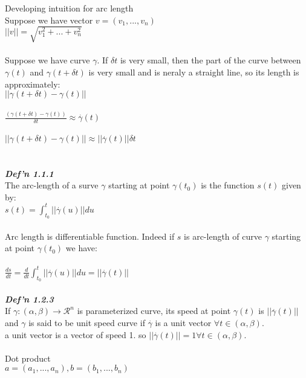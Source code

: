 \documentclass[12pt]{article}
\begin{document}
Developing intuition for arc length \\
Suppose we have vector \( v = (v_1, ... , v_n) \) \\
\( ||v|| = \sqrt{v_1^2 + ... + v_n^2} \) \\
\\
Suppose we have curve \( \gamma \). If \( \delta t \) is very small, then the part of the curve between \( \gamma(t) \) and \( \gamma(t + \delta t) \) is very small and is neraly a straight line, so its length is approximately: \\
\( || \gamma(t + \delta t) - \gamma (t) || \) \\
\\
\( \frac{ (\gamma (t + \delta t) - \gamma(t) ) }{\delta t} \approx \overset{.}{\gamma}(t) \) \\
\\
\( || \gamma (t + \delta t) - \gamma(t) || \approx || \overset{.}{\gamma}(t) || \delta t \) \\
\\
\\
\emph{\bfseries Def'n 1.1.1} \\
The arc-length of a surve \( \gamma \) starting at point \( \gamma(t_0) \) is the function \( s(t) \) given by: \\
\( s(t) = \int_{t_0}^{t} || \overset{.}{\gamma}(u) || du \) \\
\\
Arc length is differentiable function. Indeed if \( s \) is arc-length of curve \( \gamma \) starting at point \( \gamma(t_0) \) we have: \\
\\
\( \frac{ds}{dt} = \frac{d}{dt} \int_{t_0}^{t} || \overset{.}{\gamma}(u) || du = || \overset{.}{\gamma}(t) || \)
\\
\\
\emph{\bfseries Def'n 1.2.3} \\
If \( \gamma:(\alpha, \beta) \longrightarrow \mathcal{R}^n \) is parameterized curve, its speed at point \( \gamma(t) \) is \( || \overset{.}{\gamma}(t) || \) and \( \gamma \) is said to be unit speed curve if \( \overset{.}{\gamma} \) is a unit vector \( \forall t \in (\alpha, \beta) \). 
\\
a unit vector is a vector of speed 1. so \( || \overset{.}{\gamma}(t) || = 1 \forall t \in (\alpha, \beta) \).
\\
\\
Dot product \\
\( a = (a_1, ... , a_n), b = (b_1, ..., b_n) \) \\
\end{document}
